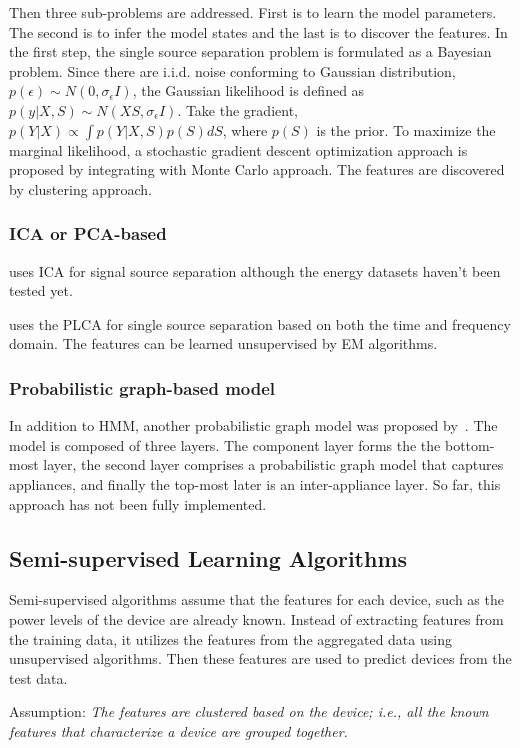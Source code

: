 Then three sub-problems are addressed. First is to learn the model parameters. 
The second is to infer the model states and the last is to discover the features. 
In the first step, the single source separation problem is formulated as a Bayesian problem. 
Since there are i.i.d. noise conforming to Gaussian distribution, 
$p(\epsilon) \sim N(0, \sigma_{\epsilon}I)$, 
the Gaussian likelihood is defined as $p(y|X, S) \sim N(XS, \sigma_{\epsilon}I)$. 
Take the gradient, 
$p({Y}|X) \propto \int p(Y|X, S) p(S) dS$, where $p(S)$ is the prior. 
To maximize the marginal likelihood, 
a stochastic gradient descent optimization approach is proposed by 
integrating with Monte Carlo approach. 
The features are discovered by clustering approach. 

\subsubsection{ICA or PCA-based}
\cite{davies2007source} uses ICA for signal source separation although 
the energy datasets haven't been tested yet. 

\cite{smaragdis2006probabilistic} uses the PLCA for single source separation based on 
both the time and frequency domain.
The features can be learned unsupervised by EM algorithms.
\fi

\subsubsection{Probabilistic graph-based model}
In addition to HMM, another probabilistic graph model was proposed by~\cite{kelly2012disaggregating}. 
The model is composed of three layers. The component layer forms the the bottom-most layer, 
the second layer comprises a probabilistic graph model that captures appliances, and
finally the top-most later is an inter-appliance layer. 
So far, this approach has not been fully implemented. 


\subsection{Semi-supervised Learning Algorithms}
Semi-supervised algorithms assume that the features for each device, such as the power levels of 
the device are already known.
Instead of extracting features from the training data, 
it utilizes the features from the aggregated data using unsupervised algorithms. 
Then these features are used to predict devices from the test data. 

Assumption: \textit{The features are clustered based on the device; i.e., all the known features
that characterize a device are grouped together.} 

